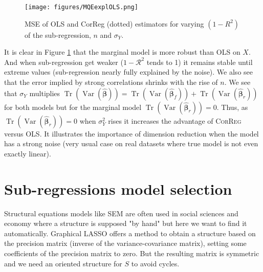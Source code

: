 \documentclass[11pt,a4paper]{article}
\begin{document}
\begin{figure}[h!]
	\texttt{[image: figures/MQEexplOLS.png]}\label{MQE1}
	\caption{MSE of OLS and CorReg (dotted) estimators for varying $(1-R^2)$ of the sub-regression, $n$ and $\sigma_Y$.}
\end{figure} 
It is clear in Figure \ref{MQE1} that the marginal model is more robust than \textsc{OLS} on $X$. And when sub-regression get weaker ($1-\mathcal{R}^2$ tends to 1) it remains stable until extreme values (sub-regression nearly fully explained by the noise). We also see that the error implied by strong correlations shrinks with the rise of $n$. 
We see that $\sigma_Y$ multiplies $\operatorname{Tr}(\operatorname{Var}(\hat{\boldsymbol{\beta}}))=\operatorname{Tr}(\operatorname{Var}(\hat{\boldsymbol{\beta}}_{f}))+\operatorname{Tr}(\operatorname{Var}(\hat{\boldsymbol{\beta}}_{r}))$ for both models but for the marginal model $\operatorname{Tr}(\operatorname{Var}(\hat{\boldsymbol{\beta}}_{r}))=0$.
 Thus, as $\operatorname{Tr}(\operatorname{Var}(\hat{\boldsymbol{\beta}}_{r}))=0$ when $\sigma_Y^2$ rises it increases the advantage of \textsc{CorReg} versus \textsc{OLS}. It illustrates the importance of dimension reduction when the model has a strong noise (very usual case on real datasets where true model is not even exactly linear).

	
\section{Sub-regressions model selection}	
Structural equations models like \textsc{SEM} are often used in social sciences and economy where a structure is supposed "by hand" but here we want to find it automatically. Graphical LASSO \cite{friedman2008sparse} offers a method to obtain a structure based on the precision matrix (inverse of the variance-covariance matrix), setting some coefficients of the precision matrix to zero. But the resulting matrix is symmetric and we need an oriented structure for $S$ to avoid cycles.
\end{document}
